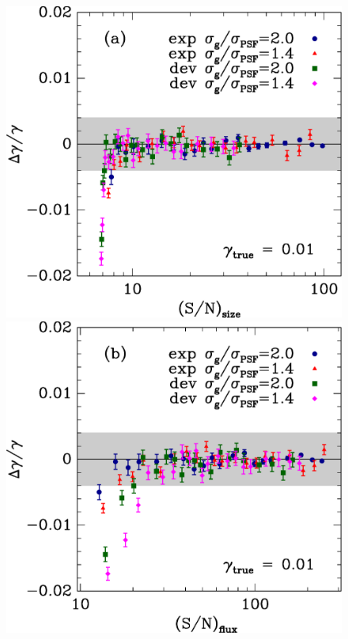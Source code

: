 \documentclass[12pt,preprint]{aastex}
\begin{document}
\begin{figure}[t] \centering
 \centering 
 \includegraphics[scale=0.4]{figures/cbafit-geg-T-s2n.eps}
 \includegraphics[scale=0.4]{figures/cbafit-geg-flux-s2n.eps}


\end{figure}
\end{document}
